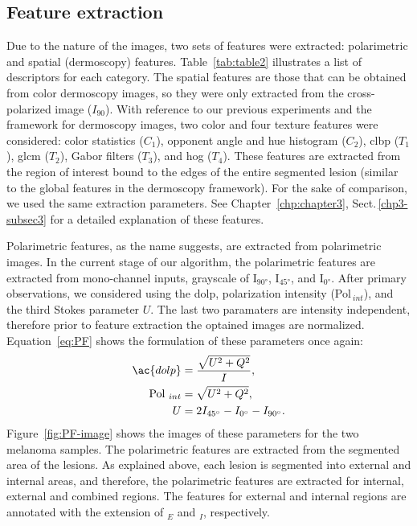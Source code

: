 \subsection{Feature extraction}
Due to the nature of the images, two sets of features were extracted: polarimetric and spatial (dermoscopy) features.
Table~\ref{tab:table2} illustrates a list of descriptors for each category.
The spatial features are those that can be obtained from color dermoscopy images, so they were only extracted from the cross-polarized image ($I_{90}$).
With reference to our previous experiments and the framework for dermoscopy images, two color and four texture features were considered: color statistics ($C_{1}$), opponent angle and hue histogram ($C_{2}$), \acf{clbp} ($T_{1}$), \acf{glcm} ($T_{2}$), Gabor filters ($T_{3}$), and \acf{hog} ($T_{4}$).
These features are extracted from the region of interest bound to the edges of the entire segmented lesion (similar to the global features in the dermoscopy framework).
For the sake of comparison, we used the same extraction parameters.
See Chapter~\ref{chp:chapter3}, Sect.\,\ref{chp3-subsec3} for a detailed explanation of these features.

Polarimetric features, as the name suggests, are extracted from polarimetric images. 
In the current stage of our algorithm, the polarimetric features are extracted from mono-channel inputs, grayscale of I$_{\ang{90}}$, I$_{\ang{45}}$, and I$_{\ang{0}}$.  
After primary observations, we considered using the \ac{dolp}, polarization intensity (Pol$_{~int}$), and the third Stokes parameter $U$.
The last two paramaters are intensity independent, therefore prior to feature extraction the optained images are normalized. 
Equation~\ref{eq:PF} shows the formulation of these parameters once again:
\begin{align}
	\ac{dolp} & = \frac{\sqrt{U^2 + Q^2}}{I}, \\
	\text{Pol}_{~int} & = \sqrt{U^2 + Q^2}, \\
	U & = 2I_{\ang{45}} - I_{\ang{0}} - I_{\ang{90}}. 
	\label{eq:PF}
\end{align}
Figure~\ref{fig:PF-image} shows the images of these parameters for the two melanoma samples.
The polarimetric features are extracted from the segmented area of the lesions.
As explained above, each lesion is segmented into external and internal areas, and therefore, the polarimetric features are extracted for internal, external and combined regions.
The features for external and internal regions are annotated with the extension of $_{E}$ and $_{I}$, respectively.

